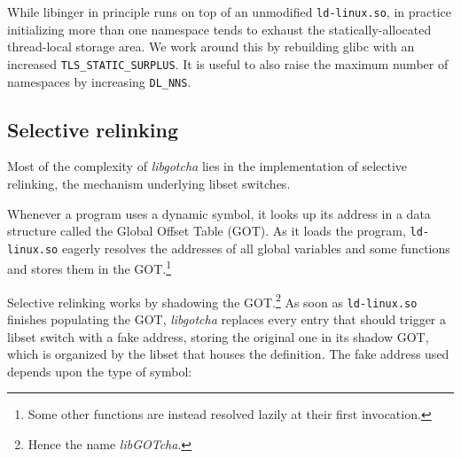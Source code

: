 
While libinger in principle runs on top of an unmodified \texttt{ld-linux.so}, in
practice initializing more than one namespace tends to exhaust the
statically-allocated thread-local storage area.  We work around this by rebuilding
glibc with an increased \texttt{TLS\_STATIC\_SURPLUS}.  It is useful to also raise
the maximum number of namespaces by increasing \texttt{DL\_NNS}.





\subsection{Selective relinking}

Most of the complexity of \textit{libgotcha} lies in the implementation of selective
relinking, the mechanism underlying libset switches.

Whenever a program uses a dynamic symbol, it looks up its address in a data structure
called the Global Offset Table (GOT).  As it loads the program, \texttt{ld-linux.so}
eagerly resolves the addresses of all global variables and some functions and stores
them in the GOT.\footnote{Some other functions are instead resolved lazily at their
first invocation.}

Selective relinking works by shadowing the GOT.\footnote{Hence the name
\textit{libGOTcha}.}  As soon as \texttt{ld-linux.so} finishes populating
the GOT, \textit{libgotcha} replaces every entry that should trigger a libset switch
with a fake address, storing the original one in its shadow GOT, which is organized
by the libset that houses the definition.  The fake address used depends upon the
type of symbol:



